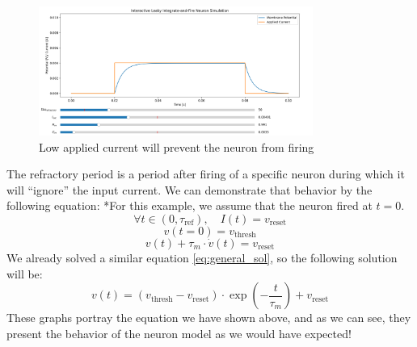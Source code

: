 \begin{figure}[H]
    \centering
    \includegraphics[width=0.8\textwidth]{methods/computational-models/graphs/LIF-heaviside-low-input.png}
    \caption{Low applied current will prevent the neuron from firing}
    \label{fig:LIF-heaviside-low-input}
\end{figure}

The refractory period is a period after firing of a specific neuron during which it will ``ignore'' the input current. We can demonstrate that behavior by the following equation:
*For this example, we assume that the neuron fired at \( t=0 \).
\begin{equation}
\forall t \in (0,\tau_{\text{ref}}), \quad I(t) = v_{\text{reset}}
\end{equation}
\begin{equation}
v(t=0) = v_{\text{thresh}}
\end{equation}
\begin{equation}
v(t) + \tau_m \cdot \dot{v}(t) = v_{\text{reset}}
\end{equation}
We already solved a similar equation \ref{eq:general_sol}, so the following solution will be:
\begin{equation}
v(t) = (v_{\text{thresh}} - v_{\text{reset}}) \cdot \exp\left(-\frac{t}{\tau_m}\right) + v_{\text{reset}}
\end{equation}
These graphs portray the equation we have shown above, and as we can see, they present the behavior of the neuron model as we would have expected!

